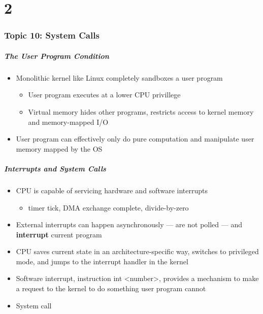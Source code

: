\documentclass[11pt,xcolor=dvipsnames]{beamer}
\newcommand{\vs}{\vspace{0.5em}}
\begin{document}
\part{2}

\section{Topic 10: System Calls}

\begin{frame}[fragile,t]
\frametitle{The User Program Condition}
\begin{itemize}
  \item Monolithic kernel like Linux completely sandboxes a user program
  \begin{itemize}
  \item User program executes at a lower CPU privillege
  \item Virtual memory hides other programs, restricts access to kernel memory and memory-mapped I/O
  \end{itemize}
  \vs \vs
  \pause
  \item User program can effectively only do pure computation and manipulate user memory mapped by the OS
\end{itemize}
\end{frame}

\begin{frame}[fragile,t]
\frametitle{Interrupts and System Calls}
\begin{itemize}
  \item CPU is capable of servicing hardware and software interrupts
  \begin{itemize}
    \item timer tick, DMA exchange complete, divide-by-zero
  \end{itemize}
  \pause
  \item External interrupts can happen asynchronously --- are not polled --- and \textbf{interrupt} current program
  \pause
  \item CPU saves current state in an architecture-specific way, switches to privileged mode, and jumps to the interrupt handler in the kernel
  \pause
  \item Software interrupt, instruction {\ttfamily int <number>}, provides a mechanism to make a request to the kernel to do something user program cannot
  \item System call
\end{itemize}
\end{frame}
\end{document}
